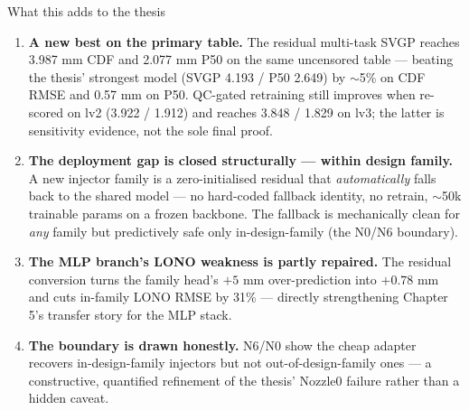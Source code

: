 \documentclass[UTF8,aspectratio=169]{ctexbeamer}
\newcommand{\good}[1]{\textcolor{green!45!black}{#1}}
\begin{document}
\begin{frame}{What this adds to the thesis}
\small
\begin{enumerate}\setlength\itemsep{5pt}
  \item \textbf{A new best on the primary table.} The residual multi-task SVGP reaches
        \good{3.987 mm} CDF and \good{2.077 mm} P50 on the same uncensored table ---
        beating the thesis' strongest model (SVGP 4.193 / P50 2.649) by $\sim$5\% on
        CDF RMSE and \good{0.57 mm} on P50. QC-gated retraining still improves when
        re-scored on lv2 (\good{3.922 / 1.912}) and reaches \good{3.848 / 1.829} on
        lv3; the latter is sensitivity evidence, not the sole final proof.
  \item \textbf{The deployment gap is closed structurally --- within design family.}
        A new injector family is a zero-initialised residual that \emph{automatically}
        falls back to the shared model --- no hard-coded fallback identity, no retrain,
        $\sim$50k trainable params on a frozen backbone. The fallback is mechanically
        clean for \emph{any} family but predictively safe only in-design-family
        (the N0/N6 boundary).
  \item \textbf{The MLP branch's LONO weakness is partly repaired.} The residual
        conversion turns the family head's $+5$ mm over-prediction into $+0.78$ mm and
        cuts in-family LONO RMSE by 31\% --- directly strengthening Chapter 5's
        transfer story for the MLP stack.
  \item \textbf{The boundary is drawn honestly.} N6/N0 show the cheap adapter recovers
        in-design-family injectors but not out-of-design-family ones --- a constructive,
        quantified refinement of the thesis' Nozzle0 failure rather than a hidden caveat.
\end{enumerate}
\end{frame}
\end{document}
